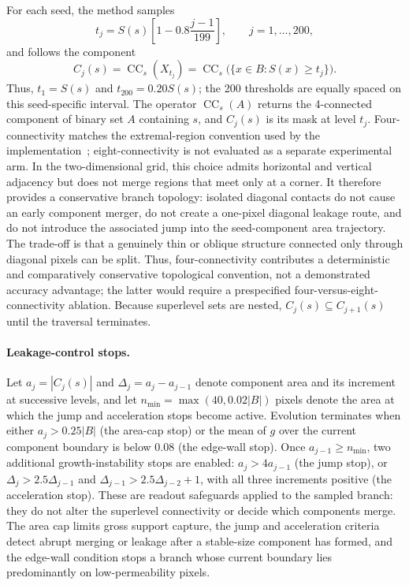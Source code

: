 \documentclass[11pt,a4paper]{article}
\begin{document}
For each seed, the method samples
\begin{equation}
 t_j=S(s)\left[1-0.8\frac{j-1}{199}\right],
 \qquad j=1,\ldots,200,
 \label{eq:traversal-thresholds}
\end{equation}
and follows the component
\begin{equation}
 C_j(s)=\operatorname{CC}_{s}(X_{t_j})
       =\operatorname{CC}_{s}\big(\{x\in B:S(x)\ge t_j\}\big).
\label{eq:seeded-components}
\end{equation}
Thus, $t_1=S(s)$ and $t_{200}=0.20S(s)$; the 200 thresholds are equally spaced
on this seed-specific interval. The operator $\operatorname{CC}_s(A)$ returns
the 4-connected component of binary set $A$ containing $s$, and $C_j(s)$ is its
mask at level $t_j$. Four-connectivity matches the extremal-region convention
used by the implementation~\cite{matas2004}; eight-connectivity is not evaluated
as a separate experimental arm. In the two-dimensional grid, this choice admits
horizontal and vertical adjacency but does not merge regions that meet only at
a corner. It therefore provides a conservative branch topology: isolated
diagonal contacts do not cause an early component merger, do not create a
one-pixel diagonal leakage route, and do not introduce the associated jump into
the seed-component area trajectory. The trade-off is that a genuinely thin or
oblique structure connected only through diagonal pixels can be split. Thus,
four-connectivity contributes a deterministic and comparatively conservative
topological convention, not a demonstrated accuracy advantage; the latter
would require a prespecified four-versus-eight-connectivity ablation. Because superlevel sets are nested,
$C_j(s)\subseteq C_{j+1}(s)$ until the traversal terminates.

\paragraph{Leakage-control stops.}
Let $a_j=|C_j(s)|$ and $\Delta_j=a_j-a_{j-1}$ denote component area and its
increment at successive levels, and let
$n_{\min}=\max(40,0.02|B|)$ pixels denote the area at which the jump and
acceleration stops become active.
Evolution terminates when either $a_j>0.25|B|$ (the area-cap stop) or the mean
of $g$ over the current component boundary is below $0.08$ (the edge-wall
stop). Once $a_{j-1}\ge n_{\min}$, two additional growth-instability stops are
enabled: $a_j>4a_{j-1}$ (the jump stop), or
$\Delta_j>2.5\Delta_{j-1}$ and
$\Delta_{j-1}>2.5\Delta_{j-2}+1$, with all three increments positive (the
acceleration stop). These are readout safeguards applied to the sampled branch:
they do not alter the superlevel connectivity or decide which components merge.
The area cap limits gross support capture, the jump and acceleration criteria
detect abrupt merging or leakage after a stable-size component has formed, and
the edge-wall condition stops a branch whose current boundary lies predominantly
on low-permeability pixels.
\end{document}
